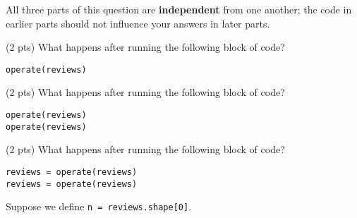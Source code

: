 \documentclass[twoside,12pt]{article}
\begin{document}
\begin{probset}
\begin{prob}[(6 pts)]
All three parts of this question are \textbf{independent} from one another; the code in earlier parts should not influence your answers in later parts. 

\begin{subprobset}

\begin{subprob}(2 pts) What happens after running the following block of code?

\begin{verbatim}
operate(reviews)
\end{verbatim}


\end{subprob}

\vspace{.1in}

\begin{subprob}(2 pts) What happens after running the following block of code?

\begin{verbatim}
operate(reviews)
operate(reviews)
\end{verbatim}


\end{subprob}

\vspace{.1in}

\begin{subprob}(2 pts) What happens after running the following block of code?

\begin{verbatim}
reviews = operate(reviews)
reviews = operate(reviews)
\end{verbatim}


\end{subprob}
    
\end{subprobset}
    
\end{prob}

\newpage

\begin{prob}[(8 pts)]

Suppose we define \texttt{n = reviews.shape[0]}.



\end{prob}
\end{probset}
\end{document}
